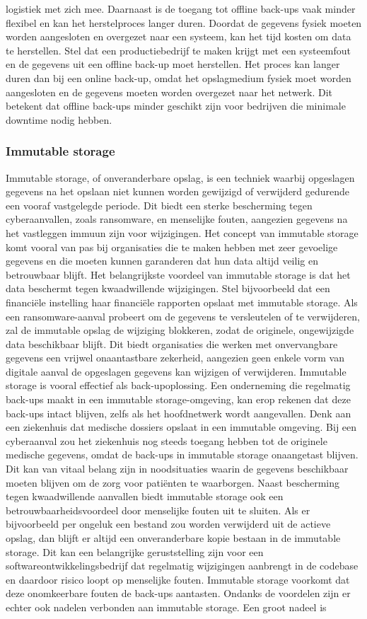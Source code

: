 logistiek met zich mee. Daarnaast is de toegang tot offline back-ups vaak minder flexibel en kan het herstelproces langer duren. Doordat de gegevens fysiek moeten worden aangesloten en overgezet naar een systeem, kan het tijd kosten om data te herstellen. Stel dat een productiebedrijf te maken krijgt met een systeemfout en de gegevens uit een offline back-up moet herstellen. Het proces kan langer duren dan bij een online back-up, omdat het opslagmedium fysiek moet worden aangesloten en de gegevens moeten worden overgezet naar het netwerk. Dit betekent dat offline back-ups minder geschikt zijn voor bedrijven die minimale downtime nodig hebben.
\subsubsection{Immutable storage}
Immutable storage, of onveranderbare opslag, is een techniek waarbij opgeslagen gegevens na het opslaan niet kunnen worden gewijzigd of verwijderd gedurende een vooraf vastgelegde periode. Dit biedt een sterke bescherming tegen cyberaanvallen, zoals ransomware, en menselijke fouten, aangezien gegevens na het vastleggen immuun zijn voor wijzigingen. Het concept van immutable storage komt vooral van pas bij organisaties die te maken hebben met zeer gevoelige gegevens en die moeten kunnen garanderen dat hun data altijd veilig en betrouwbaar blijft. Het belangrijkste voordeel van immutable storage is dat het data beschermt tegen kwaadwillende wijzigingen. Stel bijvoorbeeld dat een financiële instelling haar financiële rapporten opslaat met immutable storage. Als een ransomware-aanval probeert om de gegevens te versleutelen of te verwijderen, zal de immutable opslag de wijziging blokkeren, zodat de originele, ongewijzigde data beschikbaar blijft. Dit biedt organisaties die werken met onvervangbare gegevens een vrijwel onaantastbare zekerheid, aangezien geen enkele vorm van digitale aanval de opgeslagen gegevens kan wijzigen of verwijderen. Immutable storage is vooral effectief als back-upoplossing. Een onderneming die regelmatig back-ups maakt in een immutable storage-omgeving, kan erop rekenen dat deze back-ups intact blijven, zelfs als het hoofdnetwerk wordt aangevallen. Denk aan een ziekenhuis dat medische dossiers opslaat in een immutable omgeving. Bij een cyberaanval zou het ziekenhuis nog steeds toegang hebben tot de originele medische gegevens, omdat de back-ups in immutable storage onaangetast blijven. Dit kan van vitaal belang zijn in noodsituaties waarin de gegevens beschikbaar moeten blijven om de zorg voor patiënten te waarborgen. Naast bescherming tegen kwaadwillende aanvallen biedt immutable storage ook een betrouwbaarheidsvoordeel door menselijke fouten uit te sluiten. Als er bijvoorbeeld per ongeluk een bestand zou worden verwijderd uit de actieve opslag, dan blijft er altijd een onveranderbare kopie bestaan in de immutable storage. Dit kan een belangrijke geruststelling zijn voor een softwareontwikkelingsbedrijf dat regelmatig wijzigingen aanbrengt in de codebase en daardoor risico loopt op menselijke fouten. Immutable storage voorkomt dat deze onomkeerbare fouten de back-ups aantasten. Ondanks de voordelen zijn er echter ook nadelen verbonden aan immutable storage. Een groot nadeel is 